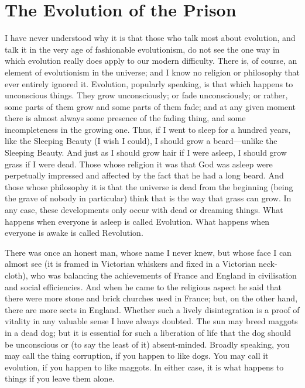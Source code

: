 \documentclass{book}
\begin{document}
\chapter{The Evolution of the Prison}
\label{chapter-6}
I have never understood why it is that those who talk most about evolution, and talk it in the very age of fashionable evolutionism, do not see the one way in which evolution really does apply to our modern difficulty. There is, of course, an element of evolutionism in the universe; and I know no religion or philosophy that ever entirely ignored it. Evolution, popularly speaking, is that which happens to unconscious things. They grow unconsciously; or fade unconsciously; or rather, some parts of them grow and some parts of them fade; and at any given moment there is almost always some presence of the fading thing, and some incompleteness in the growing one. Thus, if I went to sleep for a hundred years, like the Sleeping Beauty (I wish I could), I should grow a beard—unlike the Sleeping Beauty. And just as I should grow hair if I were asleep, I should grow grass if I were dead. Those whose religion it was that God was asleep were perpetually impressed and affected by the fact that he had a long beard. And those whose philosophy it is that the universe is dead from the beginning (being the grave of nobody in particular) think that is the way that grass can grow. In any case, these developments only occur with dead or dreaming things. What happens when everyone is asleep is called Evolution. What happens when everyone is awake is called Revolution.

There was once an honest man, whose name I never knew, but whose face I can almost see (it is framed in Victorian whiskers and fixed in a Victorian neck-cloth), who was balancing the achievements of France and England in civilisation and social efficiencies. And when he came to the religious aspect he said that there were more stone and brick churches used in France; but, on the other hand, there are more sects in England. Whether such a lively disintegration is a proof of vitality in any valuable sense I have always doubted. The sun may breed maggots in a dead dog; but it is essential for such a liberation of life that the dog should be unconscious or (to say the least of it) absent-minded. Broadly speaking, you may call the thing corruption, if you happen to like dogs. You may call it evolution, if you happen to like maggots. In either case, it is what happens to things if you leave them alone.
\end{document}

